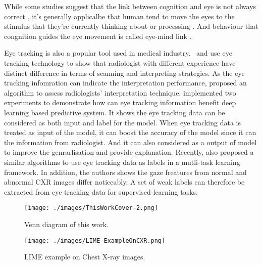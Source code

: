 While some studies suggest that the link between cognition and eye is not always correct \citep{Anderson2004EyeMovementNegativeSupport, Schall2014EyeTrackingIntro}, it's generally applicalbe that human tend to move the eyes to the stimulus that they're currently thinking about or processing \citep{Cater2020BestPracticeEyeTracking}. And behaviour that congnition guides the eye movement is called eye-mind link \citep{Reichle2012EyeMindLink1, Reichle2010EyeMindLink2}.

Eye tracking is also a popular tool used in medical industry.~\citet{Manning2003ExpreienceRadiologist} and \citet{Nicholas2015PassingGlance} use eye tracking technology to show that radiologist with different experience have distinct difference in terms of scanning and interpreting strategies. As the eye tracking infomration can indicate the interpretation performance, \citet{McLaughlin2017EvaluateRadiologistPeformanceLevel} proposed an algorithm to assess radiologists' interpretation technique. \citet{Karargyris2021EyeGazePaper} implemented two experiments to demonstrate how can eye tracking information benefit deep learning based predictive system. It shows the eye tracking data can be considered as both input and label for the model. When eye tracking data is treated as input of the model, it can boost the accuracy of the model since it can the information from radiologist. And it can also considered as a output of model to improve the genrarlisation and provide explanation. Recently, \citep{Saab2021EyeTrackingCXRClassification} also proposed a similar algorithms to use eye tracking data as labels in a mutli-task learning framework. In addition, the authors shows the gaze freatures from normal and abnormal CXR images differ noticeably. A set of weak labels can therefore be extracted from eye tracking data for supervised-learning tasks.


\begin{figure}[!h]
    \centering
    \texttt{[image: ./images/ThisWorkCover-2.png]}
    \caption{Venn diagram of this work.}
    \label{fig: this_work_cover}
\end{figure}

\begin{figure}[!h]
    \centering
    \texttt{[image: ./images/LIME\_ExampleOnCXR.png]}
    \caption{LIME example on Chest X-ray images. \citep{Teixeira2021LIMEAndGradCAMOnCXR}}
    \label{fig: LIME_ExampleOnCXR}
\end{figure}

